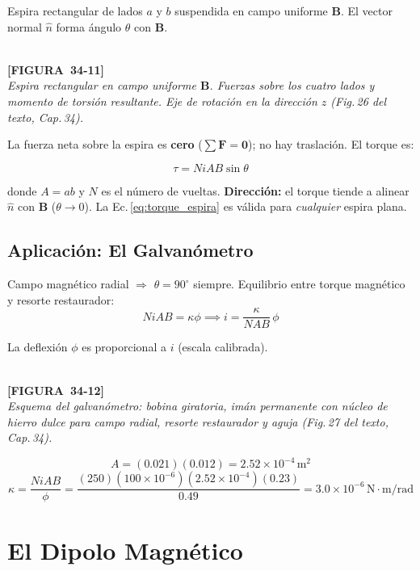 \documentclass[12pt, letterpaper]{report}
\numberwithin{equation}{section}
\newcommand{\vB}[1]{\boldsymbol{#1}}          %
\newcommand{\un}[1]{\,\mathrm{#1}}            %
\newcommand{\figplaceholder}[2]{%
  \begin{tcolorbox}[figbox]
    \centering
    \textcolor{NavyBlue!50}{\rule{0pt}{2.8cm}}\\[4pt]
    {\small\color{NavyBlue}\textbf{[FIGURA\ #1]}\\[2pt]
    \textit{#2}}
  \end{tcolorbox}
}
\begin{document}
Espira rectangular de lados $a$ y $b$ suspendida en campo uniforme
$\vB{B}$. El vector normal $\hat{n}$ forma ángulo $\theta$ con $\vB{B}$.

\figplaceholder{34-11}{Espira rectangular en campo uniforme $\vB{B}$. Fuerzas
sobre los cuatro lados y momento de torsión resultante. Eje de rotación
en la dirección $z$ (Fig.\,26 del texto, Cap.\,34).}

La fuerza neta sobre la espira es \textbf{cero} ($\sum\vB{F}=\vB{0}$);
no hay traslación. El torque es:

\begin{equation}
  \boxed{\tau = NiAB\sin\theta}
  \label{eq:torque_espira}
\end{equation}

donde $A=ab$ y $N$ es el número de vueltas.
\textbf{Dirección:} el torque tiende a alinear $\hat{n}$ con $\vB{B}$
($\theta\to0$). La Ec.\,\eqref{eq:torque_espira} es válida para
\textit{cualquier} espira plana.

\subsection{Aplicación: El Galvanómetro}

Campo magnético radial $\Rightarrow$ $\theta=90^\circ$ siempre.
Equilibrio entre torque magnético y resorte restaurador:
\[
  NiAB = \kappa\phi \implies i = \frac{\kappa}{NAB}\,\phi
\]

La deflexión $\phi$ es proporcional a $i$ (escala calibrada).

\figplaceholder{34-12}{Esquema del galvanómetro: bobina giratoria, imán permanente
con núcleo de hierro dulce para campo radial, resorte restaurador y aguja
(Fig.\,27 del texto, Cap.\,34).}

\begin{tcolorbox}[exbox,
  title=Ejemplo — Galvanómetro (250 vueltas, $B=0.23\un{T}$,
  $i=100\,\mu\mathrm{A}$, $\phi=28^\circ=0.49\un{rad}$)]
  \[
    A = (0.021)(0.012) = 2.52\times10^{-4}\un{m}^2
  \]
  \[
    \kappa = \frac{NiAB}{\phi}
           = \frac{(250)(100\times10^{-6})(2.52\times10^{-4})(0.23)}{0.49}
           = 3.0\times10^{-6}\un{N\cdot m/rad}
  \]
\end{tcolorbox}

\section{El Dipolo Magnético}
\end{document}
